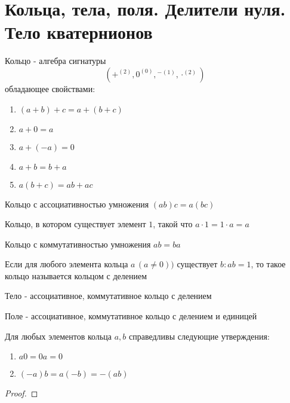 \documentclass[../main/document.tex]{subfiles}
\begin{document}
\section{Кольца, тела, поля. Делители нуля. Тело кватернионов}
\begin{dfn}[Кольцо]
Кольцо - алгебра сигнатуры
$$(+^{(2)},0^{(0)},{{}^{-}}^{(1)},\cdot^{(2)})$$
обладающее свойствами:
\begin{enumerate}
\item $(a+b)+c=a+(b+c)$
\item $a+0=a$
\item $a+(-a)=0$
\item $a+b=b+a$
\item $a(b+c)=ab+ac$
\end{enumerate}
\end{dfn}
\begin{dfn}
Кольцо с ассоциативностью умножения $(ab)c=a(bc)$
\end{dfn}
\begin{dfn}
Кольцо, в котором существует элемент $1$, такой что $a\cdot 1=1\cdot a=a$
\end{dfn}
\begin{dfn}
Кольцо с коммутативностью умножения $ab=ba$
\end{dfn}
\begin{dfn}
Если для любого элемента кольца $a\,(a\neq 0))$ существует $b:ab=1$, то такое кольцо называется кольцом с делением
\end{dfn}
\begin{dfn}[Тело]
Тело - ассоциативное, коммутативное кольцо с делением
\end{dfn}
\begin{dfn}[Поле]
Поле - ассоциативное, коммутативное кольцо с делением и единицей
\end{dfn}
\begin{exm}

\end{exm}
\begin{thm}
Для любых элементов кольца $a,b$ справедливы следующие утверждения:
\begin{enumerate}
\item $a0=0a=0$
\item $(-a)b=a(-b)=-(ab)$
\end{enumerate}
\begin{proof}

\end{proof}
\end{thm}
\end{document}
